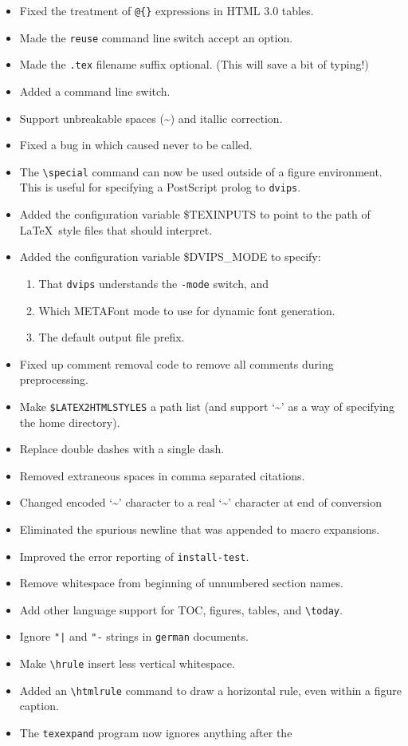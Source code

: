 \begin{changebar}
\begin{htmllist}
\begin{itemize}
\item Fixed the treatment of \verb|@{}| expressions in HTML 3.0 tables.
\item Made the \texttt{reuse} command line switch accept an option.
\item Made the \texttt{.tex} filename suffix optional. (This will
save a bit of typing!)
\item Added a  command line switch.
\item Support unbreakable spaces (\~{}) and itallic correction.
\item Fixed a bug in  which caused  never
to be called.
\item The \verb|\special| 
command can now be used outside
of a figure environment.  This is useful for specifying
a PostScript prolog to \texttt{dvips}.
\item Added the configuration variable \$TEXINPUTS to point
to the path of \LaTeX\ style files that \latextohtml{} should interpret.
\item Added the configuration variable \$DVIPS\_MODE to specify:
\begin{enumerate}
\item That \texttt{dvips} understands the \texttt{-mode} switch, and
\item Which METAFont mode to use for dynamic font generation.
\item The default output file prefix.
\end{enumerate}
\item Fixed up comment removal code to remove all comments during preprocessing.
\item Make \texttt{\$LATEX2HTMLSTYLES} a path list (and support `\~{}' as 
a way of specifying the home directory).
\item Replace double dashes with a single dash.
\item Removed extraneous spaces in comma separated citations.
\item Changed encoded `\~{}' character to a real `\~{}' character at end of conversion
\item Eliminated the spurious newline that was appended to macro
expansions.
\item Improved the error reporting of \texttt{install-test}.
\item Remove whitespace from beginning of unnumbered section names.
\item Add other language support for TOC, figures, tables, and
\verb|\today|.
\item Ignore \verb+"|+ and \verb+"-+ strings in \texttt{german} documents.
\item Make \verb|\hrule| insert less vertical whitespace.
\item Added an \verb|\htmlrule| 
command to draw a horizontal rule, even within a figure caption.
\item The \texttt{texexpand} program now ignores anything after the
\begin{verbatim}


\end{verbatim}
\end{itemize}
\end{htmllist}
\end{changebar}

